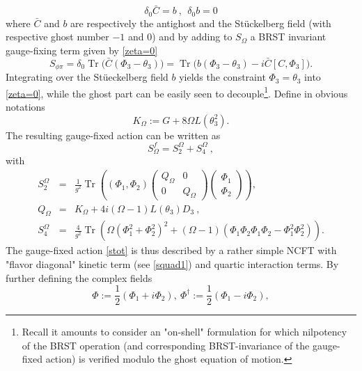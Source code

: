 \documentclass[a4paper,11pt,twoside]{article}
\numberwithin{equation}{section}
\DeclareMathOperator{\tr}{Tr}
\theoremstyle{nonumberplain}
\newcounter{and}
\begin{document}
%
\begin{equation}
\delta_0 {\bar{C}} = b \ , \ \ \delta_0b = 0 \label{contractible-brs}
\end{equation}
%
where ${\bar{C}}$ and $b$ are respectively the antighost and the St\"uckelberg field (with respective ghost number $-1$ and $0$) and by adding to $S_\Omega$ a BRST invariant gauge-fixing term given by \eqref{zeta=0}%
%
\begin{equation}
S_{\phi\pi}=\delta_0\tr\big({\bar{C}}(\Phi_3-\theta_3) \big)=\tr\big(b(\Phi_3-\theta_3)-i{\bar{C}}[C,\Phi_3]\big)\label{gauge-fix}.
\end{equation}
%
Integrating over the St\"ueckelberg field $b$ yields the constraint $\Phi_3=\theta_3$ into \eqref{zeta=0}, while the ghost part can be easily seen to decouple{\footnote{Recall it amounts to consider an "on-shell" formulation for which nilpotency of the BRST operation (and corresponding BRST-invariance of the gauge-fixed action) is verified modulo the ghost equation of motion.}}. Define in obvious notations%
%
\begin{equation}
K_\Omega := G + 8 \Omega L(\theta_3^2) \label{operator-K}.
\end{equation}
%
The resulting gauge-fixed action can be written as%
%
\begin{equation}
S^f_\Omega = S_2^{\Omega} + S_4^{\Omega} \ , \label{stot}
\end{equation}
with%
\begin{eqnarray}
S_2^{\Omega} &=& \frac{1}{g^2} \tr \left((\Phi_1,\Phi_2)
\begin{pmatrix}
Q_\Omega&0\\
0&Q_\Omega
\end{pmatrix} 
\begin{pmatrix}
\Phi_1\\
\Phi_2
\end{pmatrix} 
\right) , \nonumber \\
Q_\Omega &=& K_\Omega + 4 i (\Omega-1) L(\theta_3) D_3 \ , \label{squad1} \\[5pt]
S_4^{\Omega} &=& \frac{4}{g^2} \tr \left( \Omega (\Phi_1^2 + \Phi_2^2)^2 + (\Omega-1)(\Phi_1\Phi_2\Phi_1\Phi_2 - \Phi_1^2\Phi_2^2) \right) . \label{squart}
\end{eqnarray}
%
The gauge-fixed action \eqref{stot} is thus described by a rather simple NCFT with "flavor diagonal" kinetic term (see \eqref{squad1}) and quartic interaction terms. By further defining the complex fields%
%
\begin{equation}
\Phi:=\frac{1}{2}(\Phi_1+i\Phi_2),\ \Phi^\dag:=\frac{1}{2}(\Phi_1-i\Phi_2),
\end{equation}
\end{document}
